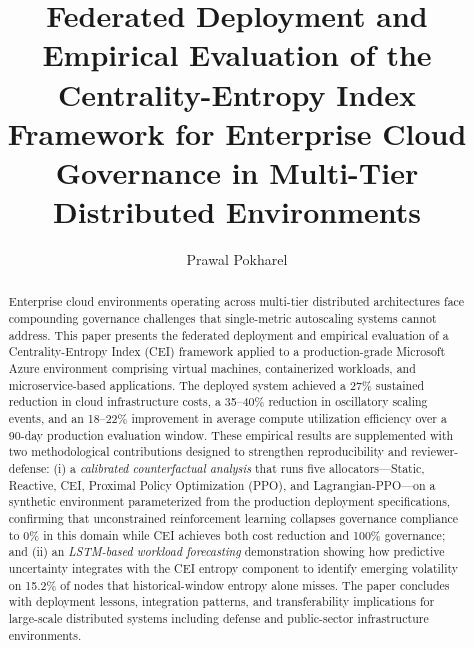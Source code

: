 \documentclass[runningheads]{llncs}
\begin{document}
\title{Federated Deployment and Empirical Evaluation of the Centrality-Entropy Index Framework for Enterprise Cloud Governance in Multi-Tier Distributed Environments}


\author{Prawal Pokharel\orcidID{}}


\maketitle

\begin{abstract}
Enterprise cloud environments operating across multi-tier distributed architectures face compounding governance challenges that single-metric autoscaling systems cannot address. This paper presents the federated deployment and empirical evaluation of a Centrality-Entropy Index (CEI) framework applied to a production-grade Microsoft Azure environment comprising virtual machines, containerized workloads, and microservice-based applications. The deployed system achieved a 27\% sustained reduction in cloud infrastructure costs, a 35--40\% reduction in oscillatory scaling events, and an 18--22\% improvement in average compute utilization efficiency over a 90-day production evaluation window. These empirical results are supplemented with two methodological contributions designed to strengthen reproducibility and reviewer-defense: (i) a \emph{calibrated counterfactual analysis} that runs five allocators---Static, Reactive, CEI, Proximal Policy Optimization (PPO), and Lagrangian-PPO---on a synthetic environment parameterized from the production deployment specifications, confirming that unconstrained reinforcement learning collapses governance compliance to 0\% in this domain while CEI achieves both cost reduction and 100\% governance; and (ii) an \emph{LSTM-based workload forecasting} demonstration showing how predictive uncertainty integrates with the CEI entropy component to identify emerging volatility on 15.2\% of nodes that historical-window entropy alone misses. The paper concludes with deployment lessons, integration patterns, and transferability implications for large-scale distributed systems including defense and public-sector infrastructure environments.
\end{abstract}
\end{document}
